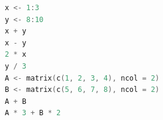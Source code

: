 \begin{lstlisting}[language=c++,label={code:09_03},caption={ベクトルの和・差，スカラーをかける}]
x <- 1:3
y <- 8:10
x + y
x - y
2 * x
y / 3
A <- matrix(c(1, 2, 3, 4), ncol = 2)
B <- matrix(c(5, 6, 7, 8), ncol = 2)
A + B
A * 3 + B * 2
\end{lstlisting}
